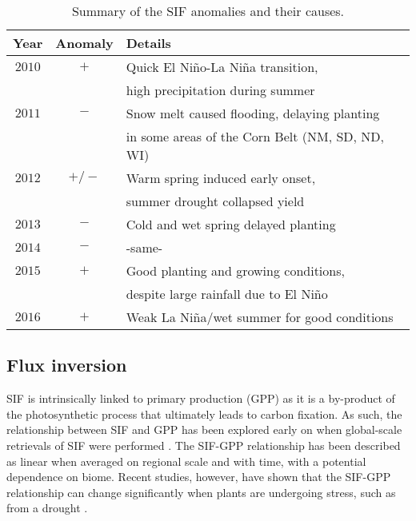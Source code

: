 \documentclass[preprint, a4paper, 10pt, times]{elsarticle}
\begin{document}


\begin{table}[htp]
\begin{center}
\begin{tabular}{c|c|l}
Year & Anomaly & Details \\
\hline
$2010$ & $+$   & Quick El Ni\~no-La Ni\~na transition, \\
             & & high precipitation during summer \\
$2011$ & $-$   & Snow melt caused flooding, delaying planting \\
             & & in some areas of the Corn Belt (NM, SD, ND, WI) \\
$2012$ & $+/-$ & Warm spring induced early onset, \\
             & & summer drought collapsed yield \\
$2013$ & $-$   & Cold and wet spring delayed planting \\
$2014$ & $-$   & -same- \\
$2015$ & $+$   & Good planting and growing conditions, \\
             & & despite large rainfall due to El Ni\~no \\
$2016$ & $+$ & Weak La Ni\~na/wet summer for good conditions \\
\end{tabular}
\end{center}
\label{tbl:anomaly_table}
\caption{Summary of the SIF anomalies and their causes.}
\end{table}%



\subsection{Flux inversion}

SIF is intrinsically linked to primary production (GPP) as it is a by-product of the photosynthetic process that ultimately leads to carbon fixation. As such, the relationship between SIF and GPP has been explored early on when global-scale retrievals of SIF were performed \citep{Frankenberg2011,Guanter2012}. The SIF-GPP relationship has been described as linear when averaged on regional scale and with time, with a potential dependence on biome. Recent studies, however, have shown that the SIF-GPP relationship can change significantly when plants are undergoing stress, such as from a drought \citep{Wieneke2018,Wohlfahrt2018}.
\end{document}
